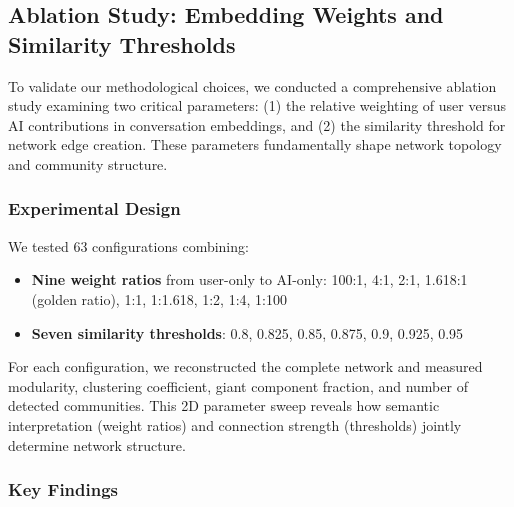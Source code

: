 
\subsection{Ablation Study: Embedding Weights and Similarity Thresholds}

To validate our methodological choices, we conducted a comprehensive ablation study examining two critical parameters: (1) the relative weighting of user versus AI contributions in conversation embeddings, and (2) the similarity threshold for network edge creation. These parameters fundamentally shape network topology and community structure.

\subsubsection{Experimental Design}

We tested 63 configurations combining:
\begin{itemize}
    \item \textbf{Nine weight ratios} from user-only to AI-only: 100:1, 4:1, 2:1, 1.618:1 (golden ratio), 1:1, 1:1.618, 1:2, 1:4, 1:100
    \item \textbf{Seven similarity thresholds}: 0.8, 0.825, 0.85, 0.875, 0.9, 0.925, 0.95
\end{itemize}

For each configuration, we reconstructed the complete network and measured modularity, clustering coefficient, giant component fraction, and number of detected communities. This 2D parameter sweep reveals how semantic interpretation (weight ratios) and connection strength (thresholds) jointly determine network structure.

\subsubsection{Key Findings}

